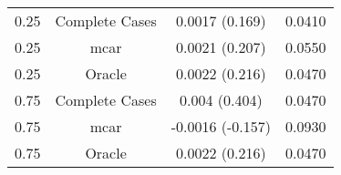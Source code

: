 \begin{table}[ht]
\centering
\begin{tabular}{cccc}
  \hline
  \hline
0.25 & Complete Cases & 0.0017 (0.169) & 0.0410 \\ 
  0.25 & mcar & 0.0021 (0.207) & 0.0550 \\ 
  0.25 & Oracle & 0.0022 (0.216) & 0.0470 \\ 
  0.75 & Complete Cases & 0.004 (0.404) & 0.0470 \\ 
  0.75 & mcar & -0.0016 (-0.157) & 0.0930 \\ 
  0.75 & Oracle & 0.0022 (0.216) & 0.0470 \\ 
   \hline
\end{tabular}
\end{table}
